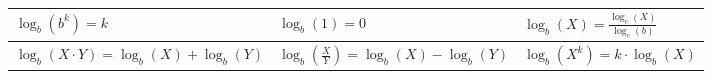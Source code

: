 \vspace{1em}
\sffamily
\bgroup
\def\arraystretch{2}
{\normalsize
\begin{center}
  \begin{tabular}{| >{\centering}m{5cm}| >{\centering}m{5cm}| >{\centering}m{5cm}|}
    \hline
    $\log_b(b^k) = k$
     &
    $\log_b(1) = 0$
     &
    $\log_b(X) = \frac{\log_c(X)}{\log_c(b)}$
    \tabularnewline \hline
    $\log_b(X \cdotp Y) = \log_b(X) + \log_b(Y)$
     &
    $\log_b(\frac{X}{Y}) = \log_b(X) - \log_b(Y)$
     &
    $\log_b(X^k) = k \cdotp \log_b(X)$
    \tabularnewline \hline
  \end{tabular}
\end{center}
}
\egroup
\vspace{1em}